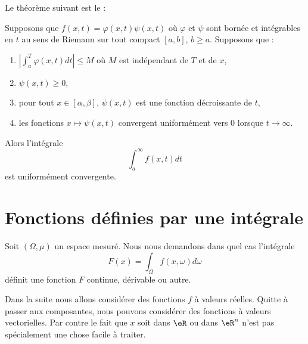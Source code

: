 Le théorème suivant est le  :
\begin{theorem}		\label{ThoAbelIntUnif}
	Supposons que $f(x,t)=\varphi(x,t)\psi(x,t)$ où $\varphi$ et $\psi$ sont bornée et intégrables en $t$ au sens de Riemann sur tout compact $[a,b]$, $b\geq a$. Supposons que :
	\begin{enumerate}
		\item $| \int_a^{T}\varphi(x,t)dt |\leq M$ où $M$ est indépendant de $T$ et de $x$,
		\item $\psi(x,t)\geq 0$,
		\item pour tout $x\in[\alpha,\beta]$, $\psi(x,t)$ est une fonction décroissante de $t$,
		\item les fonctions $x\mapsto \psi(x,t)$ convergent uniformément vers $0$ lorsque $t\to\infty$.
	\end{enumerate}
	Alors l'intégrale
	\begin{equation}
		\int_a^{\infty}f(x,t)dt
	\end{equation}
	est uniformément convergente.
\end{theorem}

\section{Fonctions définies par une intégrale}
\label{SecCHwnBDj}

Soit \( (\Omega,\mu)\) un espace mesuré. Nous nous demandons dans quel cas l'intégrale
\begin{equation}
    F(x)=\int_{\Omega}f(x,\omega)d\omega
\end{equation}
définit une fonction \( F\) continue, dérivable ou autre. 

Dans la suite nous allons considérer des fonctions \( f\) à valeurs réelles. Quitte à passer aux composantes, nous pouvons considérer des fonctions à valeurs vectorielles. Par contre le fait que \( x\) soit dans \( \eR\) ou dans \( \eR^n\) n'est pas spécialement une chose facile à traiter.

